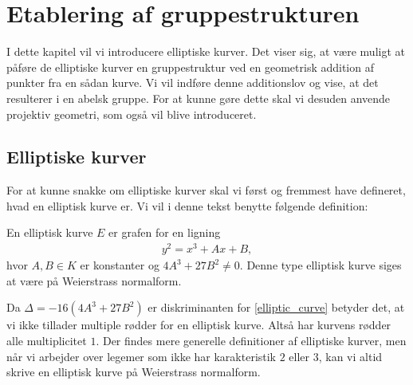 \chapter{Etablering af gruppestrukturen}
I dette kapitel vil vi introducere elliptiske kurver.
Det viser sig, at være muligt at påføre de elliptiske kurver en gruppestruktur ved en geometrisk addition af punkter fra en sådan kurve. Vi vil indføre denne additionslov og vise, at det resulterer i en abelsk gruppe. For at kunne gøre dette skal vi desuden anvende projektiv geometri, som også vil blive introduceret.

\section{Elliptiske kurver}
For at kunne snakke om elliptiske kurver skal vi først og fremmest have defineret, hvad en elliptisk kurve er. Vi vil i denne tekst benytte følgende definition:

\begin{definition}
En elliptisk kurve $E$ er grafen for en ligning
\begin{align}
	\label{elliptic_curve}
	y^2 = x^3 + Ax + B,
\end{align}
hvor $A, B \in K$ er konstanter og $4A^3 + 27B^2 \neq 0$. Denne type elliptisk kurve siges at være på Weierstrass normalform.
\end{definition}

Da $\Delta = -16(4A^3 + 27B^2)$ er diskriminanten for \eqref{elliptic_curve} betyder det, at vi ikke tillader multiple rødder for en elliptisk kurve. Altså har kurvens rødder alle multiplicitet $1$. Der findes mere generelle definitioner af elliptiske kurver, men når vi arbejder over legemer som ikke har karakteristik $2$ eller $3$, kan vi altid skrive en elliptisk kurve på Weierstrass normalform.






